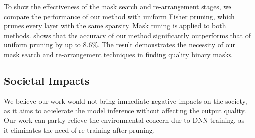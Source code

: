 To show the effectiveness of the mask search and re-arrangement stages, we compare the performance of our method with uniform Fisher pruning, which prunes every layer with the same sparsity.
Mask tuning is applied to both methods.
 shows that the accuracy of our method significantly outperforms that of uniform pruning by up to 8.6\%. The result demonstrates the necessity of our mask search and re-arrangement techniques in finding quality binary masks.

\subsection{Societal Impacts} 

We believe our work would not bring immediate negative impacts on the society, as it aims to accelerate the model inference without affecting the output quality.
Our work can partly relieve the environmental concern due to DNN training, as it eliminates the need of re-training after pruning.
